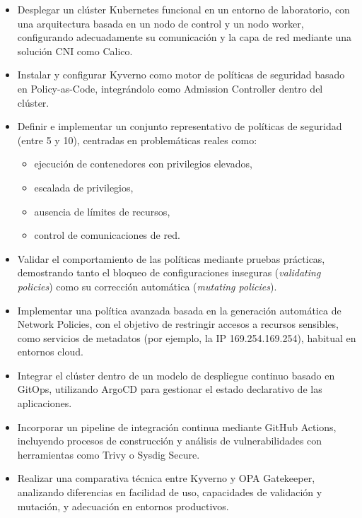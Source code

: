 \begin{itemize}
    \item Desplegar un clúster Kubernetes funcional en un entorno de laboratorio, con una arquitectura basada en un nodo de control y un nodo worker, configurando adecuadamente su comunicación y la capa de red mediante una solución CNI como Calico.

    \item Instalar y configurar Kyverno como motor de políticas de seguridad basado en Policy-as-Code, integrándolo como Admission Controller dentro del clúster.

    \item Definir e implementar un conjunto representativo de políticas de seguridad (entre 5 y 10), centradas en problemáticas reales como:
    \begin{itemize}
        \item ejecución de contenedores con privilegios elevados,
        \item escalada de privilegios,
        \item ausencia de límites de recursos,
        \item control de comunicaciones de red.
    \end{itemize}

    \item Validar el comportamiento de las políticas mediante pruebas prácticas, demostrando tanto el bloqueo de configuraciones inseguras (\textit{validating policies}) como su corrección automática (\textit{mutating policies}).

    \item Implementar una política avanzada basada en la generación automática de Network Policies, con el objetivo de restringir accesos a recursos sensibles, como servicios de metadatos (por ejemplo, la IP 169.254.169.254), habitual en entornos cloud.

    \item Integrar el clúster dentro de un modelo de despliegue continuo basado en GitOps, utilizando ArgoCD para gestionar el estado declarativo de las aplicaciones.

    \item Incorporar un pipeline de integración continua mediante GitHub Actions, incluyendo procesos de construcción y análisis de vulnerabilidades con herramientas como Trivy o Sysdig Secure.

    \item Realizar una comparativa técnica entre Kyverno y OPA Gatekeeper, analizando diferencias en facilidad de uso, capacidades de validación y mutación, y adecuación en entornos productivos.
\end{itemize}

